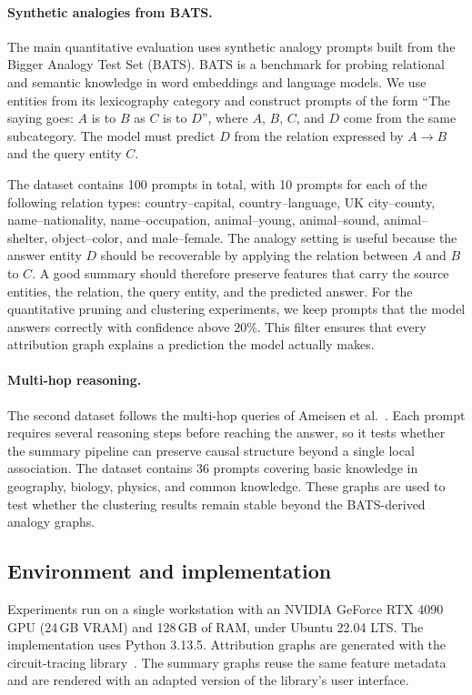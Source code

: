 \documentclass[../main.tex]{subfiles}
\begin{document}
\paragraph{Synthetic analogies from BATS.}
The main quantitative evaluation uses synthetic analogy prompts built from the
Bigger Analogy Test Set (BATS). BATS is a benchmark for probing relational and
semantic knowledge in word embeddings and language models. We use entities from
its lexicography category and construct prompts of the form ``The saying goes:
$A$ is to $B$ as $C$ is to $D$'', where $A$, $B$, $C$, and $D$ come from the
same subcategory. The model must predict $D$ from the relation expressed by
$A \to B$ and the query entity $C$.

The dataset contains 100 prompts in total, with 10 prompts for each of the
following relation types: country--capital, country--language, UK city--county,
name--nationality, name--occupation, animal--young, animal--sound,
animal--shelter, object--color, and male--female. The analogy setting is useful
because the answer entity $D$ should be recoverable by applying the relation
between $A$ and $B$ to $C$. A good summary should therefore preserve features
that carry the source entities, the relation, the query entity, and the predicted
answer. For the quantitative pruning and clustering experiments, we keep prompts
that the model answers correctly with confidence above $20\%$. This filter
ensures that every attribution graph explains a prediction the model actually
makes.

\paragraph{Multi-hop reasoning.}
The second dataset follows the multi-hop queries of Ameisen et
al.~\cite{ameisen2025circuit}. Each prompt requires several reasoning steps
before reaching the answer, so it tests whether the summary pipeline can preserve
causal structure beyond a single local association. The dataset contains 36
prompts covering basic knowledge in geography, biology, physics, and common
knowledge. These graphs are used to test whether the clustering results remain
stable beyond the BATS-derived analogy graphs.

\subsection{Environment and implementation}

Experiments run on a single workstation with an NVIDIA GeForce RTX 4090 GPU
(24\,GB VRAM) and 128\,GB of RAM, under Ubuntu 22.04 LTS. The implementation
uses Python 3.13.5. Attribution graphs are generated with the circuit-tracing
library~\cite{circuit-tracer}. The summary graphs reuse the same feature
metadata and are rendered with an adapted version of the library's user
interface.
\end{document}
